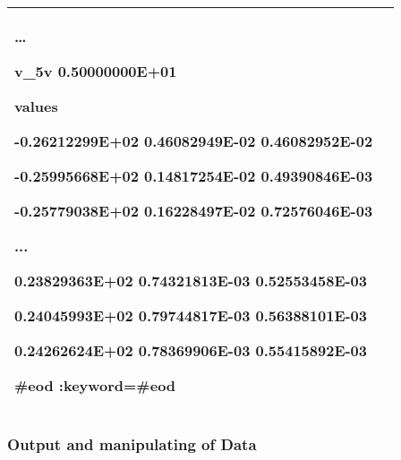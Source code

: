 \documentclass[]{article}
\begin{document}
\begin{longtable}[]{@{}ll@{}}
\begin{minipage}[t]{0.47\columnwidth}
\ldots{}

v\_5v 0.50000000E+01

values

-0.26212299E+02 0.46082949E-02 0.46082952E-02

-0.25995668E+02 0.14817254E-02 0.49390846E-03

-0.25779038E+02 0.16228497E-02 0.72576046E-03

...

0.23829363E+02 0.74321813E-03 0.52553458E-03

0.24045993E+02 0.79744817E-03 0.56388101E-03

0.24262624E+02 0.78369906E-03 0.55415892E-03

\#eod \textbf{:keyword=\#eod}\strut
\end{minipage}\tabularnewline
\bottomrule
\end{longtable}

\hypertarget{output-and-manipulating-of-data}{%
\subsubsection{Output and manipulating of
Data}\label{output-and-manipulating-of-data}}
\end{document}
